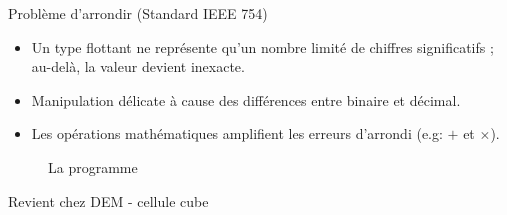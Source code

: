 \documentclass[10pt]{beamer}
\begin{document}
\begin{frame}{Problème d'arrondir (Standard IEEE 754)}
    \begin{itemize}
        \item Un type flottant ne représente qu’un nombre limité de chiffres significatifs ; au-delà, la valeur devient inexacte.
        \item Manipulation délicate à cause des différences entre binaire et décimal.
        \item Les opérations mathématiques amplifient les erreurs d’arrondi (e.g: $+$ et $\times$).
    \end{itemize}
    \begin{figure}[h]
        \centering
        \caption{La programme}
    \end{figure}
\end{frame}






\begin{frame}{Revient chez DEM - cellule cube}
    \begin{center}
    \end{center}
\end{frame}
\end{document}
